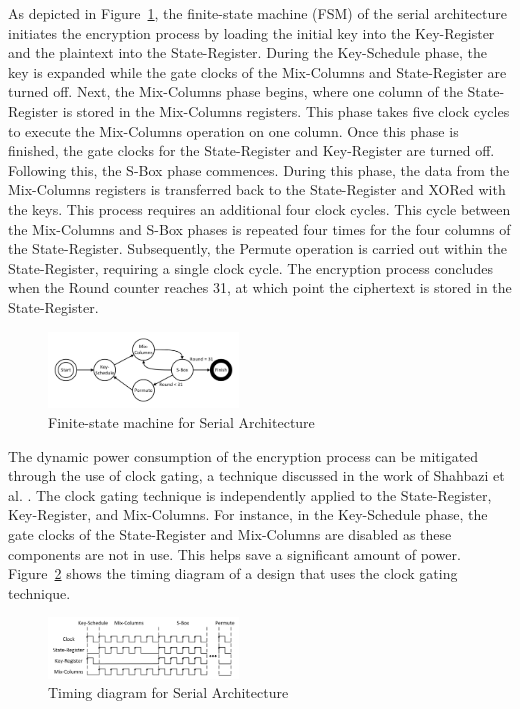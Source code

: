 \documentclass[final,5p,times,twocolumn]{elsarticle}
\begin{document}
As depicted in Figure~\ref{serial_fsm_fig}, the finite-state machine (FSM) of the serial architecture initiates the encryption process by loading the initial key into the Key-Register and the plaintext into the State-Register.
During the Key-Schedule phase, the key is expanded while the gate clocks of the Mix-Columns and State-Register are turned off.
Next, the Mix-Columns phase begins, where one column of the State-Register is stored in the Mix-Columns registers. This phase takes five clock cycles to execute the Mix-Columns operation on one column.
Once this phase is finished, the gate clocks for the State-Register and Key-Register are turned off.
Following this, the S-Box phase commences. During this phase, the data from the Mix-Columns registers is transferred back to the State-Register and XORed with the keys. This process requires an additional four clock cycles.
This cycle between the Mix-Columns and S-Box phases is repeated four times for the four columns of the State-Register.
Subsequently, the Permute operation is carried out within the State-Register, requiring a single clock cycle.
The encryption process concludes when the Round counter reaches 31, at which point the ciphertext is stored in the State-Register.

\begin{figure}[h]%
    \centering
    \includegraphics[width=0.45\textwidth]{./fig/serial-fsm.pdf}
    \caption{Finite-state machine for Serial Architecture}\label{serial_fsm_fig}
\end{figure}

The dynamic power consumption of the encryption process can be mitigated through the use of clock gating, a technique discussed in the work of Shahbazi et al. \cite{Shahbazi2021}.
The clock gating technique is independently applied to the State-Register, Key-Register, and Mix-Columns.
For instance, in the Key-Schedule phase, the gate clocks of the State-Register and Mix-Columns are disabled as these components are not in use.
This helps save a significant amount of power. Figure~\ref{serial_time_diagrm} shows the timing diagram of a design that uses the clock gating technique.

\begin{figure}[h]%
    \centering
    \includegraphics[width=0.45\textwidth]{./fig/serial-time.pdf}
    \caption{Timing diagram for Serial Architecture}\label{serial_time_diagrm}
\end{figure}
\end{document}
